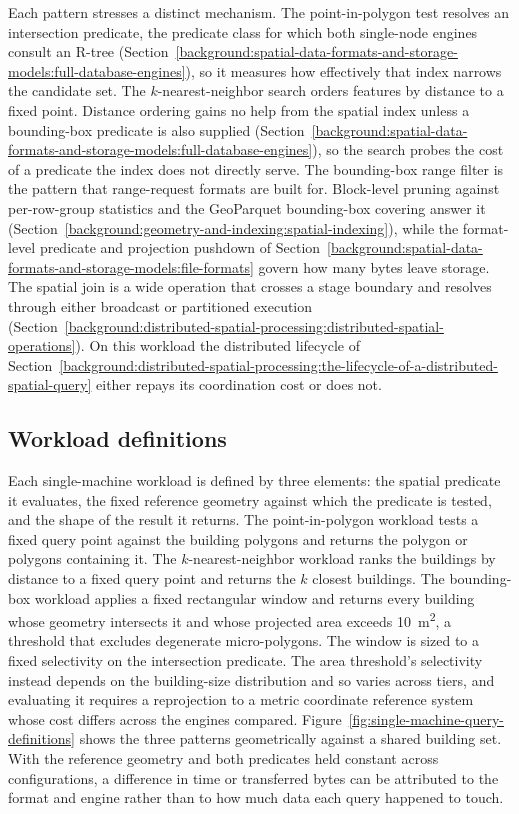 Each pattern stresses a distinct mechanism. The point-in-polygon test resolves an intersection predicate, the predicate class for which both single-node engines consult an R-tree (Section~\ref{background:spatial-data-formats-and-storage-models:full-database-engines}), so it measures how effectively that index narrows the candidate set. The $k$-nearest-neighbor search orders features by distance to a fixed point. Distance ordering gains no help from the spatial index unless a bounding-box predicate is also supplied (Section~\ref{background:spatial-data-formats-and-storage-models:full-database-engines}), so the search probes the cost of a predicate the index does not directly serve. The bounding-box range filter is the pattern that range-request formats are built for. Block-level pruning against per-row-group statistics and the GeoParquet bounding-box covering answer it (Section~\ref{background:geometry-and-indexing:spatial-indexing}), while the format-level predicate and projection pushdown of Section~\ref{background:spatial-data-formats-and-storage-models:file-formats} govern how many bytes leave storage. The spatial join is a wide operation that crosses a stage boundary and resolves through either broadcast or partitioned execution (Section~\ref{background:distributed-spatial-processing:distributed-spatial-operations}). On this workload the distributed lifecycle of Section~\ref{background:distributed-spatial-processing:the-lifecycle-of-a-distributed-spatial-query} either repays its coordination cost or does not.

\subsection{Workload definitions}
\label{research-design-and-methodology:workloads:workload-definitions}

Each single-machine workload is defined by three elements: the spatial predicate it evaluates, the fixed reference geometry against which the predicate is tested, and the shape of the result it returns. The point-in-polygon workload tests a fixed query point against the building polygons and returns the polygon or polygons containing it. The $k$-nearest-neighbor workload ranks the buildings by distance to a fixed query point and returns the $k$ closest buildings. The bounding-box workload applies a fixed rectangular window and returns every building whose geometry intersects it and whose projected area exceeds \SI{10}{\meter\squared}, a threshold that excludes degenerate micro-polygons. The window is sized to a fixed selectivity on the intersection predicate. The area threshold's selectivity instead depends on the building-size distribution and so varies across tiers, and evaluating it requires a reprojection to a metric coordinate reference system whose cost differs across the engines compared. Figure~\ref{fig:single-machine-query-definitions} shows the three patterns geometrically against a shared building set. With the reference geometry and both predicates held constant across configurations, a difference in time or transferred bytes can be attributed to the format and engine rather than to how much data each query happened to touch.

